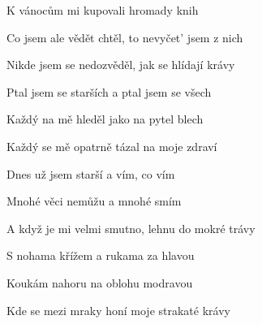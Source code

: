 \begin{song}
\bigskip

K vánocům mi kupovali hromady knih \par
Co jsem ale vědět chtěl, to nevyčet' jsem z nich \par
{}Nikde jsem se nedozvěděl,  jak se hlídají krávy \par
{}Ptal jsem se starších a ptal jsem se všech \par
Každý na mě hleděl jako na pytel blech \par
{}Každý se mě opatrně  tázal na moje zdraví \par

\bigskip

\Refren

\bigskip

Dnes už jsem starší a vím, co vím \par
Mnohé věci nemůžu a mnohé smím \par
{}A když je mi velmi smutno,  lehnu do mokré trávy \par
{}S nohama křížem a rukama za hlavou \par
Koukám nahoru na oblohu modravou \par
{}Kde se mezi mraky honí  moje strakaté krávy \par

\bigskip

\Refren {}

\end{song}
